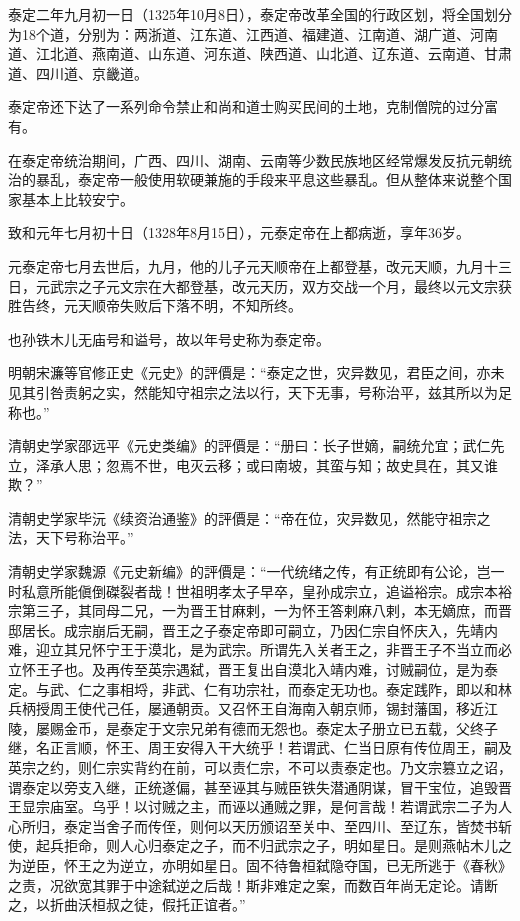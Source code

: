 泰定二年九月初一日（1325年10月8日），泰定帝改革全国的行政区划，将全国划分为18个道，分别为：两浙道、江东道、江西道、福建道、江南道、湖广道、河南道、江北道、燕南道、山东道、河东道、陕西道、山北道、辽东道、云南道、甘肃道、四川道、京畿道。

泰定帝还下达了一系列命令禁止和尚和道士购买民间的土地，克制僧院的过分富有。

在泰定帝统治期间，广西、四川、湖南、云南等少数民族地区经常爆发反抗元朝统治的暴乱，泰定帝一般使用软硬兼施的手段来平息这些暴乱。但从整体来说整个国家基本上比较安宁。

致和元年七月初十日（1328年8月15日），元泰定帝在上都病逝，享年36岁。

元泰定帝七月去世后，九月，他的儿子元天顺帝在上都登基，改元天顺，九月十三日，元武宗之子元文宗在大都登基，改元天历，双方交战一个月，最终以元文宗获胜告终，元天顺帝失败后下落不明，不知所终。

也孙铁木儿无庙号和谥号，故以年号史称为泰定帝。

明朝宋濂等官修正史《元史》的評價是：“泰定之世，灾异数见，君臣之间，亦未见其引咎责躬之实，然能知守祖宗之法以行，天下无事，号称治平，兹其所以为足称也。”

清朝史学家邵远平《元史类编》的評價是：“册曰：长子世嫡，嗣统允宜；武仁先立，泽承人思；忽焉不世，电灭云移；或曰南坡，其蛮与知；故史具在，其又谁欺？”

清朝史学家毕沅《续资治通鉴》的評價是：“帝在位，灾异数见，然能守祖宗之法，天下号称治平。”

清朝史学家魏源《元史新编》的評價是：“一代统绪之传，有正统即有公论，岂一时私意所能傎倒磔裂者哉！世祖明孝太子早卒，皇孙成宗立，追谥裕宗。成宗本裕宗第三子，其同母二兄，一为晋王甘麻剌，一为怀王答剌麻八剌，本无嫡庶，而晋邸居长。成宗崩后无嗣，晋王之子泰定帝即可嗣立，乃因仁宗自怀庆入，先靖内难，迎立其兄怀宁王于漠北，是为武宗。所谓先入关者王之，非晋王子不当立而必立怀王子也。及再传至英宗遇弑，晋王复出自漠北入靖内难，讨贼嗣位，是为泰定。与武、仁之事相埒，非武、仁有功宗社，而泰定无功也。泰定践阼，即以和林兵柄授周王使代己任，屡通朝贡。又召怀王自海南入朝京师，锡封藩国，移近江陵，屡赐金币，是泰定于文宗兄弟有德而无怨也。泰定太子册立已五载，父终子继，名正言顺，怀王、周王安得入干大统乎！若谓武、仁当日原有传位周王，嗣及英宗之约，则仁宗实背约在前，可以责仁宗，不可以责泰定也。乃文宗篡立之诏，谓泰定以旁支入继，正统遂偏，甚至诬其与贼臣铁失潜通阴谋，冒干宝位，追毁晋王显宗庙室。乌乎！以讨贼之主，而诬以通贼之罪，是何言哉！若谓武宗二子为人心所归，泰定当舍子而传侄，则何以天历颁诏至关中、至四川、至辽东，皆焚书斩使，起兵拒命，则人心归泰定之子，而不归武宗之子，明如星日。是则燕帖木儿之为逆臣，怀王之为逆立，亦明如星日。固不待鲁桓弑隐夺国，已无所逃于《春秋》之责，况欲宽其罪于中途弑逆之后哉！斯非难定之案，而数百年尚无定论。请断之，以折曲沃桓叔之徒，假托正谊者。”

